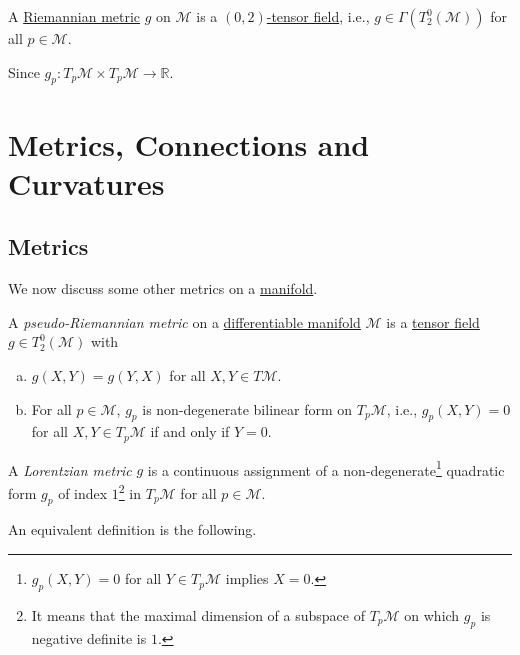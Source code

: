 \begin{eg}
	A \hyperref[def:Riemannian-metric]{Riemannian metric} \(g\) on \(\mathcal{M} \) is a \hyperref[def:tensor-field]{\((0, 2)\)-tensor field}, i.e., \(g\in \Gamma (T_2^0 (\mathcal{M} ))\) for all \(p \in \mathcal{M} \).
\end{eg}
\begin{explanation}
	Since \(g_p \colon T_p \mathcal{M} \times T_p \mathcal{M} \to \mathbb{R} \).
\end{explanation}

\section{Metrics, Connections and Curvatures}
\subsection{Metrics}
We now discuss some other metrics on a \hyperref[def:smooth-manifold]{manifold}.

\begin{definition}\label{def:pseudo-Riemannian-metric}
	A \emph{pseudo-Riemannian metric} on a \hyperref[def:smooth-manifold]{differentiable manifold} \(\mathcal{M} \) is a \hyperref[def:tensor-field]{tensor field} \(g\in T_2^0 (\mathcal{M}) \) with
	\begin{enumerate}[(a)]
		\item \(g(X, Y) = g(Y, X)\) for all \(X, Y\in T \mathcal{M} \).
		\item For all \(p\in \mathcal{M} \), \(g_p\) is non-degenerate bilinear form on \(T_p \mathcal{M} \), i.e., \(g_p(X, Y) = 0\) for all \(X, Y\in T_p \mathcal{M} \) if and only if \(Y = 0\).
	\end{enumerate}
\end{definition}

\begin{definition}\label{def:Lorentzian-metric}
	A \emph{Lorentzian metric} \(g\) is a continuous assignment of a non-degenerate\footnote{\(g_p(X, Y) = 0\) for all \(Y\in T_p \mathcal{M} \) implies \(X = 0\).} quadratic form \(g_p\) of index \(1\)\footnote{It means that the maximal dimension of a subspace of \(T_p \mathcal{M} \) on which \(g_p\) is negative definite is \(1\).} in \(T_p \mathcal{M} \) for all \(p\in \mathcal{M} \).
\end{definition}

An equivalent definition is the following.

